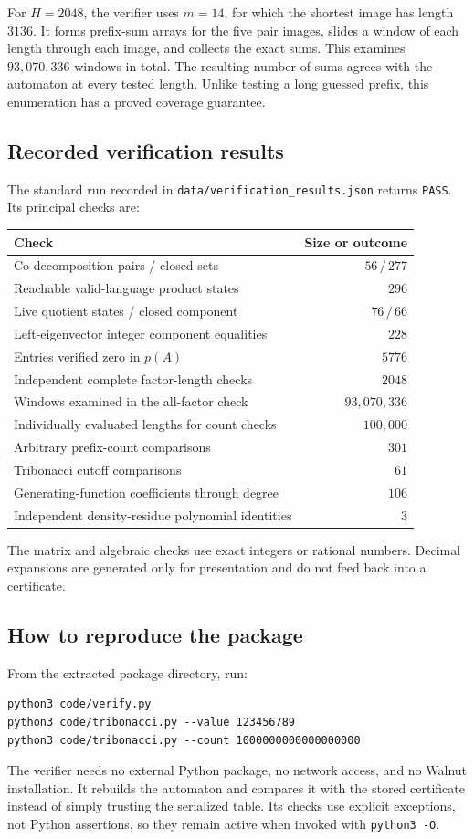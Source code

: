 \documentclass[11pt,a4paper]{article}
\theoremstyle{definition}
\theoremstyle{remark}
\newcommand{\code}[1]{\texttt{#1}}
\begin{document}
For $H=2048$, the verifier uses $m=14$, for which the shortest image has
length $3136$. It forms prefix-sum arrays for the five pair images, slides
a window of each length through each image, and collects the exact sums.
This examines $93{,}070{,}336$ windows in total. The resulting number of
sums agrees with the automaton at every tested length. Unlike testing a
long guessed prefix, this enumeration has a proved coverage guarantee.

\subsection{Recorded verification results}
The standard run recorded in \code{data/verification\_results.json}
returns \code{PASS}. Its principal checks are:
\begin{center}
\small
\begin{tabular}{@{}p{}r@{}}
\toprule
Check & Size or outcome\\
\midrule
Co-decomposition pairs / closed sets & $56\,/\,277$\\
Reachable valid-language product states & $296$\\
Live quotient states / closed component & $76\,/\,66$\\
Left-eigenvector integer component equalities & $228$\\
Entries verified zero in $p(A)$ & $5776$\\
Independent complete factor-length checks & $2048$\\
Windows examined in the all-factor check & $93{,}070{,}336$\\
Individually evaluated lengths for count checks & $100{,}000$\\
Arbitrary prefix-count comparisons & $301$\\
Tribonacci cutoff comparisons & $61$\\
Generating-function coefficients through degree & $106$\\
Independent density-residue polynomial identities & $3$\\
\bottomrule
\end{tabular}
\end{center}
The matrix and algebraic checks use exact integers or rational numbers.
Decimal expansions are generated only for presentation and do not feed
back into a certificate.

\subsection{How to reproduce the package}
From the extracted package directory, run:
\begin{lstlisting}
python3 code/verify.py
python3 code/tribonacci.py --value 123456789
python3 code/tribonacci.py --count 1000000000000000000
\end{lstlisting}
The verifier needs no external Python package, no network access, and no
Walnut installation. It rebuilds the automaton and compares it with the
stored certificate instead of simply trusting the serialized table.
Its checks use explicit exceptions, not Python assertions, so they remain
active when invoked with \code{python3 -O}.
\end{document}

